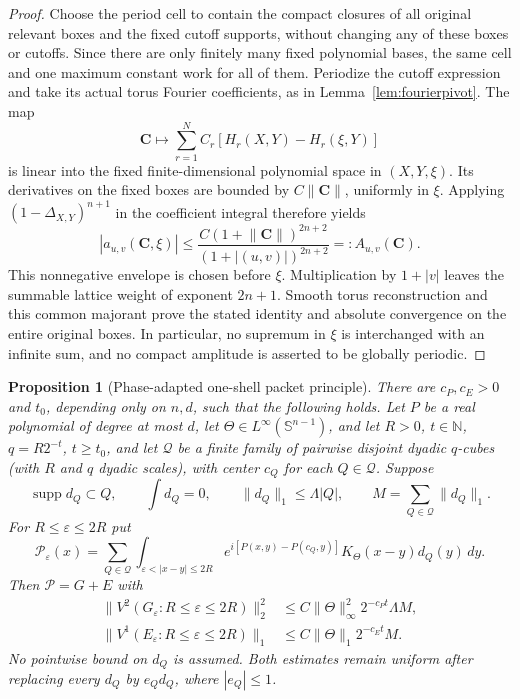 \documentclass[11pt]{article}
\numberwithin{equation}{section}
\newtheorem{proposition}[theorem]{Proposition}
\theoremstyle{remark}
\theoremstyle{definition}
\newcommand{\Sph}{\mathbb S}
\newcommand{\supp}{\operatorname{supp}}
\newcommand{\norm}[1]{\lVert #1\rVert}
\begin{document}
\begin{proof}
Choose the period cell to contain the compact closures of all original
relevant boxes and the fixed cutoff supports, without changing any of
these boxes or cutoffs.  Since there are only finitely many fixed
polynomial bases, the same cell and one maximum constant work for all
of them.  Periodize the cutoff expression and take its actual torus
Fourier coefficients, as in Lemma~\ref{lem:fourierpivot}.
The map
\[
 \mathbf C\longmapsto
 \sum_{r=1}^N C_r[H_r(X,Y)-H_r(\xi,Y)]
\]
is linear into the fixed finite-dimensional polynomial space in
$(X,Y,\xi)$.  Its derivatives on the fixed boxes are bounded by
$C\norm{\mathbf C}$, uniformly in $\xi$.  Applying
$(1-\Delta_{X,Y})^{n+1}$ in the coefficient integral therefore yields
\[
 |a_{u,v}(\mathbf C,\xi)|\le
 \frac{C(1+\norm{\mathbf C})^{2n+2}}
      {(1+|(u,v)|)^{2n+2}}=:A_{u,v}(\mathbf C).
\]
This nonnegative envelope is chosen before $\xi$.  Multiplication by
$1+|v|$ leaves the summable lattice weight of exponent $2n+1$.
Smooth torus reconstruction and this common majorant prove the stated
identity and absolute convergence on the entire original boxes.  In
particular, no supremum in $\xi$ is interchanged with an infinite sum,
and no compact amplitude is asserted to be globally periodic.
\end{proof}

\begin{proposition}[Phase-adapted one-shell packet principle]
\label{prop:direct-packet}
There are $c_P,c_E>0$ and $t_0$, depending only on $n,d$, such that the
following holds.  Let $P$ be a real polynomial of degree at most $d$, let
$\Theta\in L^\infty(\Sph^{n-1})$, and let
$R>0$, $t\in\mathbb N$, $q=R2^{-t}$,
$t\ge t_0$, and let $\mathcal Q$ be a finite family of pairwise disjoint
dyadic $q$-cubes (with $R$ and $q$ dyadic scales), with center $c_Q$ for
each $Q\in\mathcal Q$.  Suppose
\begin{equation}\label{eq:direct-packet-data}
 \supp d_Q\subset Q,\qquad \int d_Q=0,\qquad
 \norm{d_Q}_1\le\Lambda|Q|,\qquad
 M=\sum_{Q\in\mathcal Q}\norm{d_Q}_1.
\end{equation}
For $R\le\varepsilon\le2R$ put
\[
 \mathcal P_\varepsilon(x)=\sum_{Q\in\mathcal Q}
 \int_{\varepsilon<|x-y|\le2R}
 e^{i[P(x,y)-P(c_Q,y)]}K_\Theta(x-y)d_Q(y)\,dy.
\]
Then $\mathcal P=G+E$ with
\begin{align}
 \norm{V^2(G_\varepsilon:R\le\varepsilon\le2R)}_2^2
 &\le C\norm\Theta_\infty^2 2^{-c_Pt}\Lambda M,
 \label{eq:direct-packet-G}\\
 \norm{V^1(E_\varepsilon:R\le\varepsilon\le2R)}_1
 &\le C\norm\Theta_1 2^{-c_Et}M.
 \label{eq:direct-packet-E}
\end{align}
No pointwise bound on $d_Q$ is assumed.  Both estimates remain uniform
after replacing every $d_Q$ by $e_Qd_Q$, where $|e_Q|\le1$.
\end{proposition}
\end{document}
